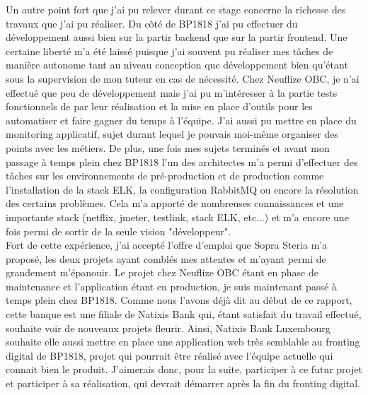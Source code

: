 	Un autre point fort que j'ai pu relever durant ce stage concerne la richesse des travaux que j'ai pu réaliser. Du côté de BP1818 j'ai pu effectuer du développement aussi bien sur la partir backend que sur la partir frontend. Une certaine liberté m'a été laissé puisque j'ai souvent pu réaliser mes tâches de manière autonome tant au niveau conception que développement bien qu'étant sous la supervision de mon tuteur en cas de nécessité. Chez Neuflize OBC, je n'ai effectué que peu de développement mais j'ai pu m'intéresser à la partie tests fonctionnels de par leur réalisation et la mise en place d'outils pour les automatiser et faire gagner du temps à l'équipe. J'ai aussi pu mettre en place du monitoring applicatif, sujet durant lequel je pouvais moi-même organiser des points avec les métiers. De plus, une fois mes sujets terminés et avant mon passage à temps plein chez BP1818 l'un des architectes m'a permi d'effectuer des tâches sur les environnements de pré-production et de production comme l'installation de la stack ELK, la configuration RabbitMQ ou encore la résolution des certains problèmes. Cela m'a apporté de nombreuses connaissances et une importante stack (netflix, jmeter, testlink, stack ELK, etc...) et m'a encore une fois permi de sortir de la seule vision "développeur". \\
	
	Fort de cette expérience, j'ai accepté l'offre d'emploi que Sopra Steria m'a proposé, les deux projets ayant comblés mes attentes et m'ayant permi de grandement m'épanouir. Le projet chez Neuflize OBC étant en phase de maintenance et l'application étant en production, je suis maintenant passé à temps plein chez BP1818. Comme nous l'avons déjà dit au début de ce rapport, cette banque est une filiale de Natixis Bank qui, étant satisfait du travail effectué, souhaite voir de nouveaux projets fleurir. Ainsi, Natixis Bank Luxembourg souhaite elle aussi mettre en place une application web très semblable au fronting digital de BP1818, projet qui pourrait être réalisé avec l'équipe actuelle qui connait bien le produit. J'aimerais donc, pour la suite, participer à ce futur projet et participer à sa réalisation, qui devrait démarrer après la fin du fronting digital. 
	